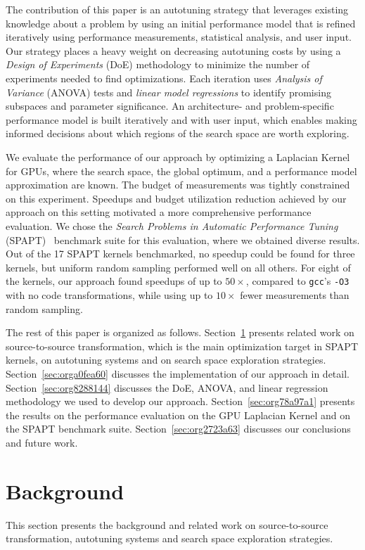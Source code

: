 \documentclass[conference]{IEEEtran}
\begin{document}
The contribution of this paper is an autotuning strategy that leverages existing
knowledge about a problem by using an initial performance model that is refined
iteratively using performance measurements, statistical analysis, and user
input. Our strategy places a heavy weight on decreasing autotuning costs by
using a \emph{Design of Experiments} (DoE) methodology to minimize the number of
experiments needed to find optimizations. Each iteration uses \emph{Analysis of
Variance} (ANOVA) tests and \emph{linear model regressions} to identify promising
subspaces and parameter significance. An architecture- and problem-specific
performance model is built iteratively and with user input, which enables making
informed decisions about which regions of the search space are worth exploring.

We evaluate the performance of our approach by optimizing a Laplacian Kernel for
GPUs, where the search space, the global optimum, and a performance model
approximation are known. The budget of measurements was tightly constrained on
this experiment. Speedups and budget utilization reduction achieved by our
approach on this setting motivated a more comprehensive performance evaluation.
We chose the \emph{Search Problems in Automatic Performance Tuning}
(SPAPT)~\cite{balaprakash2012spapt} benchmark suite for this evaluation,
where we obtained diverse results. Out of the 17 SPAPT kernels benchmarked, no
speedup could be found for three kernels, but uniform random sampling performed
well on all others. For eight of the kernels, our approach found speedups of up
to \(50\times\), compared to \texttt{gcc}'s \texttt{-O3} with no code transformations, while
using up to \(10\times\) fewer measurements than random sampling.

The rest of this paper is organized as follows. Section~\ref{sec:orgeaa2e3e}
presents related work on source-to-source transformation, which is the main
optimization target in SPAPT kernels, on autotuning systems and on search space
exploration strategies. Section~\ref{sec:orga0fea60}
discusses the implementation of our approach in detail. Section~\ref{sec:org8288144} discusses the DoE, ANOVA, and linear regression methodology we used
to develop our approach. Section~\ref{sec:org78a97a1} presents the
results on the performance evaluation on the GPU Laplacian Kernel and on the
SPAPT benchmark suite. Section~\ref{sec:org2723a63} discusses our conclusions and
future work.
\section{Background}
\label{sec:orgeaa2e3e}
This section presents the background and related work on source-to-source
transformation, autotuning systems and search space exploration strategies.
\end{document}
